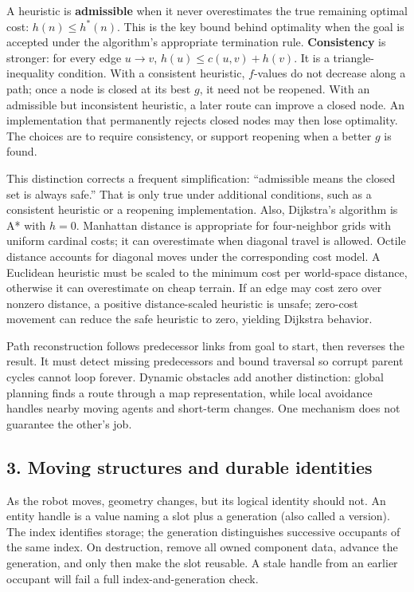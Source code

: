A heuristic is \textbf{admissible} when it never overestimates the true remaining optimal cost: \(h(n)\leq h^*(n)\). This is the key bound behind optimality when the goal is accepted under the algorithm's appropriate termination rule. \textbf{Consistency} is stronger: for every edge \(u\rightarrow v\), \(h(u)\leq c(u,v)+h(v)\). It is a triangle-inequality condition. With a consistent heuristic, \(f\)-values do not decrease along a path; once a node is closed at its best \(g\), it need not be reopened. With an admissible but inconsistent heuristic, a later route can improve a closed node. An implementation that permanently rejects closed nodes may then lose optimality. The choices are to require consistency, or support reopening when a better \(g\) is found.

This distinction corrects a frequent simplification: ``admissible means the closed set is always safe.'' That is only true under additional conditions, such as a consistent heuristic or a reopening implementation. Also, Dijkstra's algorithm is A* with \(h=0\). Manhattan distance is appropriate for four-neighbor grids with uniform cardinal costs; it can overestimate when diagonal travel is allowed. Octile distance accounts for diagonal moves under the corresponding cost model. A Euclidean heuristic must be scaled to the minimum cost per world-space distance, otherwise it can overestimate on cheap terrain. If an edge may cost zero over nonzero distance, a positive distance-scaled heuristic is unsafe; zero-cost movement can reduce the safe heuristic to zero, yielding Dijkstra behavior.

Path reconstruction follows predecessor links from goal to start, then reverses the result. It must detect missing predecessors and bound traversal so corrupt parent cycles cannot loop forever. Dynamic obstacles add another distinction: global planning finds a route through a map representation, while local avoidance handles nearby moving agents and short-term changes. One mechanism does not guarantee the other's job.

\subsection{3. Moving structures and durable identities}\label{05-engine-i-ch008-moving-structures-and-durable-identities}

As the robot moves, geometry changes, but its logical identity should not. An entity handle is a value naming a slot plus a generation (also called a version). The index identifies storage; the generation distinguishes successive occupants of the same index. On destruction, remove all owned component data, advance the generation, and only then make the slot reusable. A stale handle from an earlier occupant will fail a full index-and-generation check.

